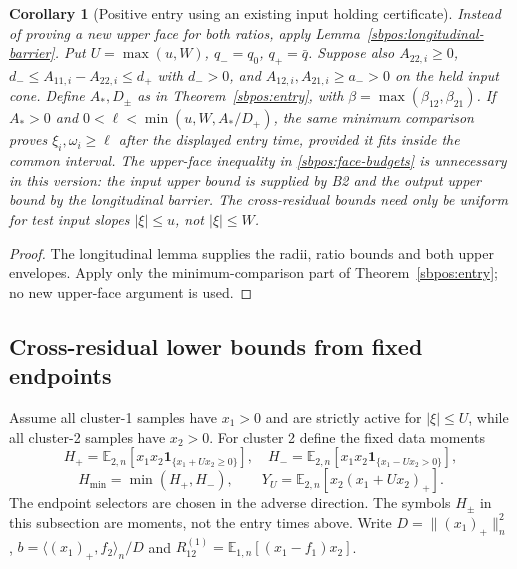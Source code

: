\documentclass{article} %
\theoremstyle{plain}
\newtheorem{corollary}[theorem]{Corollary}
\theoremstyle{definition}
\theoremstyle{remark}
\begin{document}
\begin{corollary}[Positive entry using an existing input holding certificate]
\label{sbpos:held-input-entry}
Instead of proving a new upper face for both ratios, apply
Lemma~\ref{sbpos:longitudinal-barrier}. Put $U=\max(u,W)$,
$q_-=q_0$, $q_+=\bar q$. Suppose also $A_{22,i}\ge0$,
$d_-\le A_{11,i}-A_{22,i}\le d_+$ with $d_->0$, and
$A_{12,i},A_{21,i}\ge a_->0$ on the held input cone.
Define $A_*,D_\pm$ as in Theorem~\ref{sbpos:entry}, with
$\beta=\max(\beta_{12},\beta_{21})$.
If $A_*>0$ and
$0<\ell<\min(u,W,A_*/D_+)$, the same minimum comparison proves
$\xi_i,\omega_i\ge\ell$ after the displayed entry time, provided it fits
inside the common interval.
The upper-face inequality in \eqref{sbpos:face-budgets} is unnecessary in
this version: the input upper bound is supplied by B2 and the output
upper bound by the longitudinal barrier. The cross-residual bounds need
only be uniform for test input slopes $|\xi|\le u$, not $|\xi|\le W$.
\end{corollary}
\begin{proof}
The longitudinal lemma supplies the radii, ratio bounds and both upper
envelopes. Apply only the minimum-comparison part of
Theorem~\ref{sbpos:entry}; no new upper-face argument is used.
\end{proof}

\subsection{Cross-residual lower bounds from fixed endpoints}

Assume all cluster-1 samples have $x_1>0$ and are strictly active for
$|\xi|\le U$, while all cluster-2 samples have $x_2>0$.
For cluster 2 define the fixed data moments
\[
 H_+=\mathbb E_{2,n}[x_1x_2\mathbf1_{\{x_1+Ux_2\ge0\}}],
 \quad
 H_-=\mathbb E_{2,n}[x_1x_2\mathbf1_{\{x_1-Ux_2>0\}}],
\]
\[
 H_{\min}=\min(H_+,H_-),\qquad
 Y_U=\mathbb E_{2,n}[x_2(x_1+Ux_2)_+].
\]
The endpoint selectors are chosen in the adverse direction. The symbols
$H_\pm$ in this subsection are moments, not the entry times above.
Write $D=\|(x_1)_+\|_n^2$, $b=\langle(x_1)_+,f_2\rangle_n/D$ and
$R_{12}^{(1)}=\mathbb E_{1,n}[(x_1-f_1)x_2]$.
\end{document}
